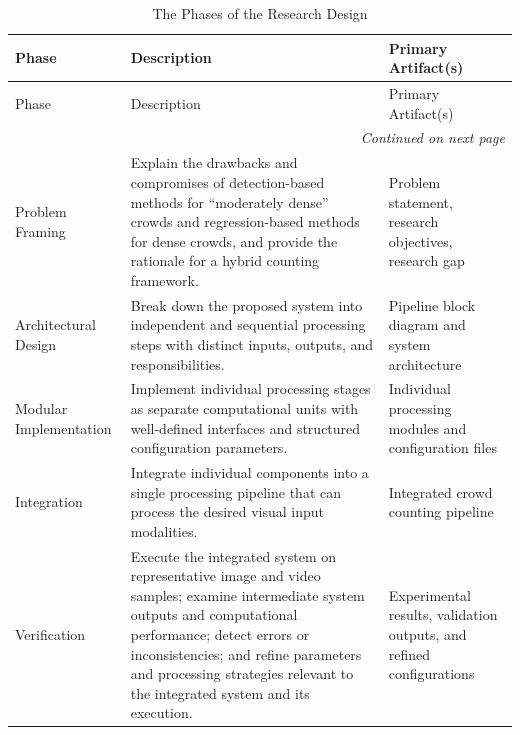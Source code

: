 \documentclass[12pt,a4paper]{report}
\begin{document}
\begin{longtable}{|p{}|p{}|p{}|}
    \caption{The Phases of the Research Design}
    \label{tab:research-design} \\
    \hline
    Phase & Description & Primary Artifact(s) \\
    \hline
    \endfirsthead

    \hline
    Phase & Description & Primary Artifact(s) \\
    \hline
    \endhead

    \hline
    \multicolumn{3}{r}{\textit{Continued on next page}} \\
    \endfoot

    \hline
    \endlastfoot

    Problem Framing
    &
    Explain the drawbacks and compromises of detection-based methods for
    ``moderately dense'' crowds and regression-based methods for dense crowds,
    and provide the rationale for a hybrid counting framework.
    &
    Problem statement, research objectives, research gap
    \\
    \hline

    Architectural Design
    &
    Break down the proposed system into independent and sequential processing
    steps with distinct inputs, outputs, and responsibilities.
    &
    Pipeline block diagram and system architecture
    \\
    \hline

    Modular Implementation
    &
    Implement individual processing stages as separate computational units
    with well-defined interfaces and structured configuration parameters.
    &
    Individual processing modules and configuration files
    \\
    \hline

    Integration
    &
    Integrate individual components into a single processing pipeline that can
    process the desired visual input modalities.
    &
    Integrated crowd counting pipeline
    \\
    \hline

    Verification
    &
    Execute the integrated system on representative image and video samples;
    examine intermediate system outputs and computational performance;
    detect errors or inconsistencies; and refine parameters and processing
    strategies relevant to the integrated system and its execution.
    &
    Experimental results, validation outputs, and refined configurations
    \\
    \hline

\end{longtable}
\end{document}
